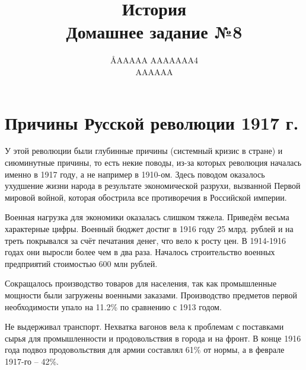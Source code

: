 \documentclass[12pt]{article}
\title{История \\ Домашнее задание №8}
\author{\AA{AAAAA AAAAAAA}{4} \\ AAAAAA}
\newcommand{\orange}[1]{{\color{orange}{#1}}}
\begin{document}
  \maketitle

  \setcounter{section}{2}
  \section{Причины Русской революции 1917 г.}

  У этой революции были глубинные причины (системный кризис в стране) и сиюминутные причины,
  то есть некие поводы, из-за которых революция началась именно в 1917 году, а не например в 1910-ом.
  Здесь поводом оказалось ухудшение жизни народа в результате экономической разрухи,
  вызванной Первой мировой войной, которая обострила все противоречия в Российской империи.

  Военная нагрузка для экономики оказалась слишком тяжела.
  Приведём весьма характерные цифры.
  Военный бюджет достиг в 1916 году 25 млрд. рублей и на треть покрывался за счёт печатания денег, что вело к росту цен.
  В 1914-1916 годах они выросли более чем в два раза.
  Началось строительство военных предприятий стоимостью 600 млн рублей.

  Сокращалось производство товаров для населения, так как промышленные мощности были загружены военными заказами.
  Производство предметов первой необходимости упало на 11.2\% по сравнению с 1913 годом.

  Не выдерживал транспорт.
  Нехватка вагонов вела к проблемам с поставками сырья для промышленности и продовольствия в города и на фронт.
  В конце 1916 года подвоз продовольствия для армии составлял 61\% от нормы, а в феврале 1917-го -- 42\%.

\end{document}

